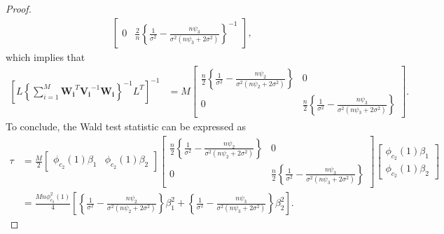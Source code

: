 \begin{proof}
\begin{align*}
\begin{bmatrix}
     0 & \frac{2}{n}\left\{\frac{1}{\sigma^2} - \frac{n\psi_3}{\sigma^2(n\psi_3+2\sigma^2)}\right\}^{-1}  \end{bmatrix},
\end{align*}
which implies that
\begin{align*}
\left[L\left\{\sum_{i=1}^M\boldsymbol{W_i}^T\boldsymbol{V_i}^{-1}\boldsymbol{W_i}\right\}^{-1}L^T\right]^{-1} &= M\begin{bmatrix} \frac{n}{2}\left\{\frac{1}{\sigma^2} - \frac{n\psi_2}{\sigma^2(n\psi_2+2\sigma^2)}\right\} & 0 \\
     0 & \frac{n}{2}\left\{\frac{1}{\sigma^2} - \frac{n\psi_3}{\sigma^2(n\psi_3+2\sigma^2)}\right\}  \end{bmatrix}.
\end{align*}
To conclude, the Wald test statistic can be expressed as
\begin{align*}
    \tau &= \frac{M}{2}\begin{bmatrix}
    \phi_{c_2}(1)\beta_1 &
    \phi_{c_2}(1)\beta_2
    \end{bmatrix}\begin{bmatrix} \frac{n}{2}\left\{\frac{1}{\sigma^2} - \frac{n\psi_2}{\sigma^2(n\psi_2+2\sigma^2)}\right\} & 0 \\
     0 & \frac{n}{2}\left\{\frac{1}{\sigma^2} - \frac{n\psi_3}{\sigma^2(n\psi_3+2\sigma^2)}\right\}  \end{bmatrix}\begin{bmatrix}
    \phi_{c_2}(1)\beta_1 \\
    \phi_{c_2}(1)\beta_2
    \end{bmatrix} \\
    &= \frac{Mn\phi^2_{c_2}(1)}{4}\left[\left\{\frac{1}{\sigma^2} - \frac{n\psi_2}{\sigma^2(n\psi_2+2\sigma^2)}\right\}\beta_1^2 + \left\{\frac{1}{\sigma^2} - \frac{n\psi_3}{\sigma^2(n\psi_3+2\sigma^2)}\right\}\beta_2^2 \right].
\end{align*}

\end{proof}

